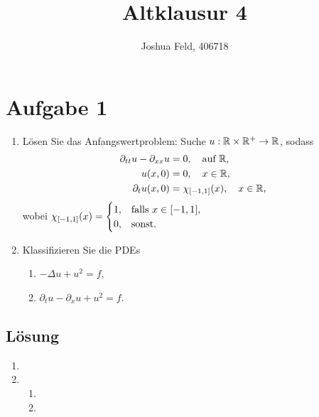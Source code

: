 \documentclass{exercise}
\institute{Applied and Computational Mathematics}
\title{Altklausur 4}
\author{Joshua Feld, 406718}
\begin{document}
    \maketitle


    \section*{Aufgabe 1}
    
    \begin{problem}
        \begin{enumerate}
            \item Lösen Sie das Anfangswertproblem: Suche \(u: \mathbb{R} \times \mathbb{R}^+ \to \mathbb{R}\), sodass
            \begin{align*}
                \partial_{tt}u - \partial_{xx}u &= 0, \quad \text{auf }\R,\\
                u\parentheses*{x, 0} &= 0, \quad x \in \R,\\
                \partial_t u\parentheses*{x, 0} &= \chi_{\brackets*{-1, 1}}\parentheses*{x}, \quad x \in \R,
            \end{align*}
            wobei \(\chi_{\brackets*{-1, 1}}\parentheses*{x} = \begin{cases}
                1, & \text{falls }x \in \brackets*{-1, 1},\\
                0, & \text{sonst}.
            \end{cases}\)
            \item Klassifizieren Sie die PDEs
            \begin{enumerate}
                \item \(-\Delta u + u^2 = f\),
                \item \(\partial_t u - \partial_x u + u^2 = f\).
            \end{enumerate}
        \end{enumerate}
    \end{problem}
    
    \subsection*{Lösung}
    \begin{enumerate}
        \item
        \item
        \begin{enumerate}
            \item
            \item
        \end{enumerate}
    \end{enumerate}
\end{document}
